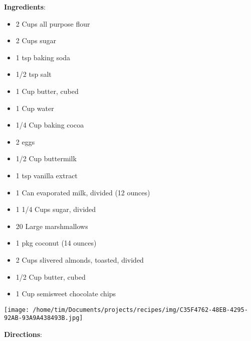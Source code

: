 \documentclass[11pt, twoside, openany]{book}
\begin{document}
\begin{minipage}[t]{0.8\linewidth}
\textbf{Ingredients}:\vspace{-3mm}
\begin{multicols}{2}
\begin{itemize}\setlength\itemsep{-1mm}
\item 2 Cups all purpose flour
\item 2 Cups sugar
\item 1 tsp baking soda
\item 1/2 tsp salt
\item 1 Cup butter, cubed
\item 1 Cup water
\item 1/4 Cup baking cocoa
\item 2 eggs
\item 1/2 Cup buttermilk
\item 1 tsp vanilla extract
\item 1 Can evaporated milk, divided (12 ounces)
\item 1 1/4 Cups sugar, divided
\item 20 Large marshmallows
\item 1 pkg coconut (14 ounces)
\item 2 Cups slivered almonds, toasted, divided
\item 1/2 Cup butter, cubed
\item 1 Cup semisweet chocolate chips
\end{itemize}
\end{multicols}
\end{minipage}
\begin{minipage}[t]{0.2\linewidth}
\centering \strut\vspace*{-\baselineskip}\newline
\texttt{[image: /home/tim/Documents/projects/recipes/img/C35F4762-48EB-4295-92AB-93A9A438493B.jpg]}\\
\end{minipage}\vspace{3mm}
\textbf{Directions}:
\end{document}
